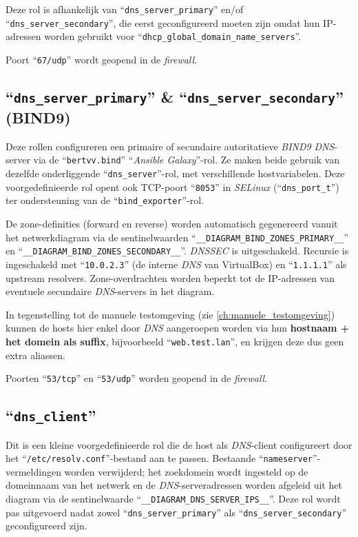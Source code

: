 Deze rol is afhankelijk van ``\texttt{dns\_server\_primary}'' en/of ``\texttt{dns\_server\_secondary}'', die eerst geconfigureerd moeten zijn omdat hun IP-adressen worden gebruikt voor ``\texttt{dhcp\_global\_domain\_name\_servers}''.

Poort ``\texttt{67/udp}'' wordt geopend in de \emph{firewall}.

\subsection{``\texttt{dns\_server\_primary}'' \& ``\texttt{dns\_server\_secondary}'' (BIND9)}%
\label{subsec:rol_dns_server}

Deze rollen configureren een primaire of secundaire autoritatieve \emph{BIND9} \emph{DNS}-server via de ``\texttt{bertvv.bind}'' ``\emph{Ansible Galaxy}''-rol. Ze maken beide gebruik van dezelfde onderliggende ``\texttt{dns\_server}''-rol, met verschillende hostvariabelen. Deze voorgedefinieerde rol opent ook TCP-poort ``\texttt{8053}'' in \emph{SELinux} (``\texttt{dns\_port\_t}'') ter ondersteuning van de ``\texttt{bind\_exporter}''-rol.

De zone-definities (forward en reverse) worden automatisch gegenereerd vanuit het netwerkdiagram via de sentinelwaarden ``\texttt{\_\_DIAGRAM\_BIND\_ZONES\_PRIMARY\_\_}'' en ``\texttt{\_\_DIAGRAM\_BIND\_ZONES\_SECONDARY\_\_}''. \emph{DNSSEC} is uitgeschakeld. Recursie is ingeschakeld met ``\texttt{10.0.2.3}'' (de interne \emph{DNS} van VirtualBox) en ``\texttt{1.1.1.1}'' als upstream resolvers. Zone-overdrachten worden beperkt tot de IP-adressen van eventuele secundaire \emph{DNS}-servers in het diagram.

In tegenstelling tot de manuele testomgeving (zie \autoref{ch:manuele_testomgeving}) kunnen de hosts hier enkel door \emph{DNS} aangeroepen worden via hun \textbf{hostnaam + het domein als suffix}, bijvoorbeeld ``\texttt{web.test.lan}'', en krijgen deze dus geen extra aliassen.

Poorten ``\texttt{53/tcp}'' en ``\texttt{53/udp}'' worden geopend in de \emph{firewall}.

\subsection{``\texttt{dns\_client}''}%
\label{subsec:rol_dns_client}

Dit is een kleine voorgedefinieerde rol die de host als \emph{DNS}-client configureert door het ``\texttt{/etc/resolv.conf}''-bestand aan te passen. Bestaande ``\texttt{nameserver}''-vermeldingen worden verwijderd; het zoekdomein wordt ingesteld op de domeinnaam van het netwerk en de \emph{DNS}-serveradressen worden afgeleid uit het diagram via de sentinelwaarde ``\texttt{\_\_DIAGRAM\_DNS\_SERVER\_IPS\_\_}''. Deze rol wordt pas uitgevoerd nadat zowel ``\texttt{dns\_server\_primary}'' als ``\texttt{dns\_server\_secondary}'' geconfigureerd zijn.

